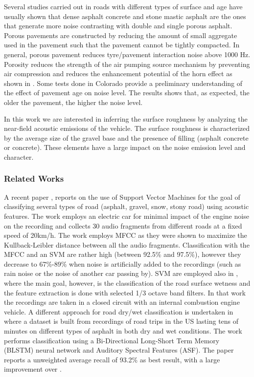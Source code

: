 Several studies \cite{freitas2009traffic} carried out in roads with different types of surface and age have usually shown that dense asphalt concrete and stone mastic asphalt are the ones that generate more noise contrasting with double and single porous asphalt. Porous pavements are constructed by reducing the amount of small aggregate used in the pavement
such that the pavement cannot be tightly compacted. In general, porous pavement reduces tyre/pavement interaction noise above 1000 Hz. Porosity reduces the strength of the air pumping source mechanism by preventing air compression and reduces the enhancement potential of the horn effect as shown in . 
Some tests \cite{hanson2004tire} done in Colorado provide a preliminary understanding of the effect of pavement age on noise level. The results shows that, as expected, the older the pavement, the higher the noise level.

In this work we are interested in inferring the surface roughness by analyzing the near-field acoustic emissions of the vehicle. The surface roughness is characterized by the average size of the gravel base and the presence of filling (asphalt concrete or concrete). These elements have a large impact on the noise emission level and character. 


\subsubsection{Related Works}

A recent paper \cite{DoganRoad2017}, reports on the use of Support Vector Machines for the goal of classifying several types of road (asphalt, gravel, snow, stony road) using acoustic features. The work employs an electric car for minimal impact of the engine noise on the recording and collects 30 audio fragments from different roads at a fixed speed of 20km/h. The work employs MFCC as they were shown to maximize the Kullback-Leibler distance between all the audio fragments. Classification with the MFCC and an SVM are rather high (between 92.5\% and 97.5\%), however they decrease to 67\%-89\% when noise is artificially added to the recordings (such as rain noise or the noise of another car passing by).
SVM are employed also in \cite{alonso2014board}, where the main goal, however, is the classification of the road surface wetness and the feature extraction is done with selected 1/3 octave band filters. In that work the recordings are taken in a closed circuit with an internal combustion engine vehicle.
A different approach for road dry/wet classification is undertaken in \cite{abdic2016detecting} where a dataset is built from recordings of road trips in the US lasting tens of minutes on different types of asphalt in both dry and wet conditions. The work performs classification using a Bi-Directional Long-Short Term Memory (BLSTM) neural network \cite{hochreiter1997long} and Auditory Spectral Features (ASF). The paper reports a unweighted average recall of 93.2\% as best result, with a large improvement over \cite{alonso2014board}.

